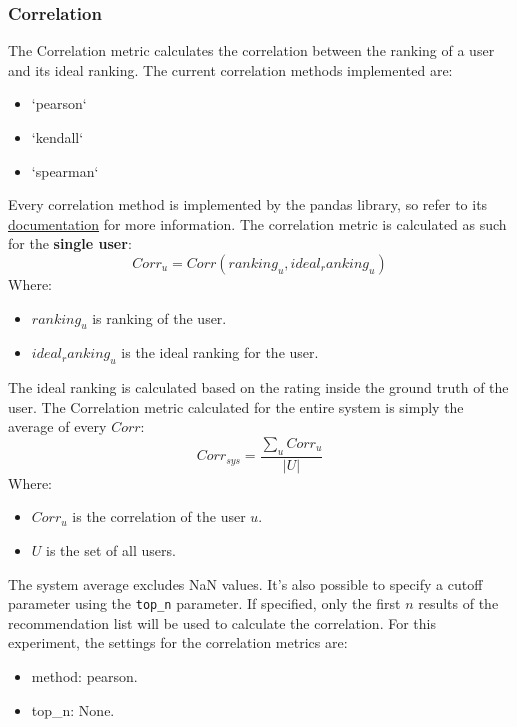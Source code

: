 \documentclass[11pt]{article}
\begin{document}
\subsubsection{Correlation}\label{subsubsec:corr}
The Correlation metric calculates the correlation between the ranking of a user and its ideal ranking.
The current correlation methods implemented are:
\begin{itemize}
    \item `pearson`
    \item `kendall`
    \item `spearman`
\end{itemize}
\hfill\break
\hfill\break
Every correlation method is implemented by the pandas library, so refer to its
\href{https://pandas.pydata.org/docs/reference/api/pandas.Series.corr.html}{documentation} for more information.
\hfill\break
\hfill\break
The correlation metric is calculated as such for the \textbf{single user}:
\hfill\break
\hfill\break
    \[
        Corr_u = Corr(ranking_u, ideal_ranking_u)
    \]
\hfill\break
\hfill\break
    Where:
\begin{itemize}
    \item $ranking_u$ is ranking of the user.
    \item $ideal_ranking_u$ is the ideal ranking for the user.
\end{itemize}
\hfill\break
\hfill\break
The ideal ranking is calculated based on the rating inside the ground truth of the user.
The Correlation metric calculated for the entire system is simply the average of every $Corr$:
\hfill\break
\hfill\break
    \[
        Corr_{sys} = \frac{\sum_{u} Corr_u}{|U|}
    \]
\hfill\break
\hfill\break
    Where:
\begin{itemize}
    \item $Corr_u$ is the correlation of the user $u$.
    \item $U$ is the set of all users.
\end{itemize}
\hfill\break
\hfill\break
The system average excludes NaN values.
It's also possible to specify a cutoff parameter using the \texttt{top\_n} parameter.
If specified, only the first $n$ results of the recommendation list will be used to calculate the correlation.
For this experiment, the settings for the correlation metrics are:
\begin{itemize}
    \item method: pearson.
    \item top_n: None.
\end{itemize}
\hfill\break
\hfill\break
\end{document}
